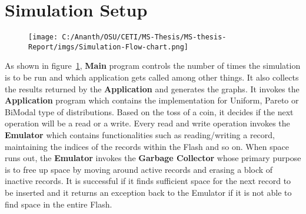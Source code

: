 \section{Simulation Setup}

\begin{figure}[H]
	\centering
	\texttt{[image: C:/Ananth/OSU/CETI/MS-Thesis/MS-thesis-Report/imgs/Simulation-Flow-chart.png]}
	 \label{Simulator-FlowChart}
\end{figure}

As shown in figure~\ref{Simulator-FlowChart}, {\bf Main} program controls the number of times the simulation is to be run and which application gets called among other things. It also collects the results returned by the {\bf Application} and generates the graphs. It invokes the {\bf Application} program which contains the implementation for Uniform, Pareto or BiModal type of distributions. Based on the toss of a coin, it decides if the next operation will be a read or a write. Every read and write operation invokes the {\bf Emulator} which contains functionalities such as reading/writing a record, maintaining the indices of the records within the Flash and so on. When space runs out, the {\bf Emulator} invokes the {\bf Garbage Collector} whose primary purpose is to free up space by moving around active records and erasing a block of inactive records. It is successful if it finds sufficient space for the next record to be inserted and it returns an exception back to the Emulator if it is not able to find space in the entire Flash.


